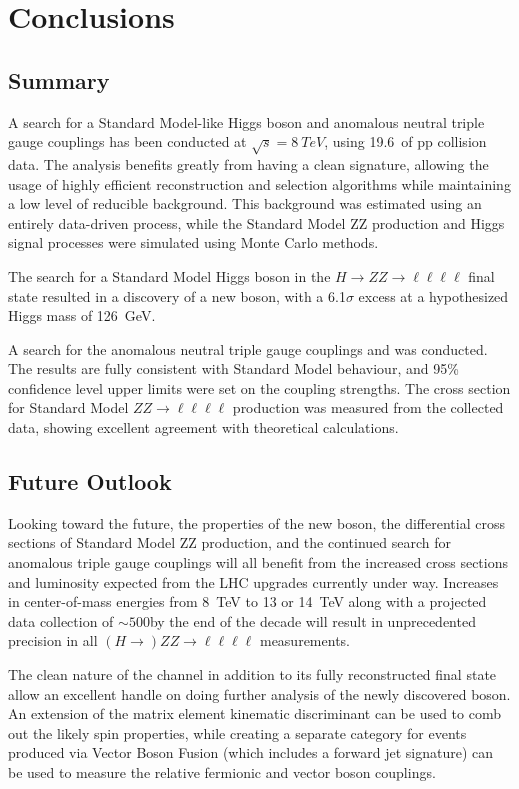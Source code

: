 \chapter{Conclusions}
\label{chapter:conclusions}
\section{Summary}

A search for a Standard Model-like Higgs boson and anomalous neutral triple
gauge couplings has been conducted at $\sqrt{s} = 8~TeV$, using 19.6~\fbinv of
pp collision data. The analysis benefits greatly from having a clean signature,
allowing the usage of highly efficient reconstruction and selection algorithms
while maintaining a low level of reducible background. This background was
estimated using an entirely data-driven process, while the Standard Model ZZ
production and Higgs signal processes were simulated using Monte Carlo methods.

The search for a Standard Model Higgs boson in the $H\rightarrow ZZ\rightarrow
\ell\ell\ell\ell$ final state resulted in a discovery of a new boson, with a
6.1$\sigma$ excess at a hypothesized Higgs mass of 126~GeV. 

A search for the anomalous neutral triple gauge couplings \ffour and \ffive was
conducted. The results are fully consistent with Standard Model behaviour, and
95\% confidence level upper limits were set on the coupling strengths. The cross
section for Standard Model $ZZ\rightarrow\ell\ell\ell\ell$ production was
measured from the collected data, showing excellent agreement with theoretical
calculations.


\section{Future Outlook}
Looking toward the future, the properties of the new boson, the differential
cross sections of Standard Model ZZ production, and the continued search for
anomalous triple gauge couplings will all benefit from the increased cross
sections and luminosity expected from the LHC upgrades currently under way.
Increases in center-of-mass energies from 8~TeV to 13 or 14~TeV along with a
projected data collection of ${\sim500}$\fbinv by the end of the decade will
result in unprecedented precision in all ${(H\rightarrow)ZZ\rightarrow
\ell\ell\ell\ell}$ measurements.

The clean nature of the channel in addition to its fully reconstructed final
state allow an excellent handle on doing further analysis of the newly discovered
boson. An extension of the matrix element kinematic discriminant can be used to
comb out the likely spin properties, while creating a separate category for
events produced via Vector Boson Fusion (which includes a forward jet signature)
can be used to measure the relative fermionic and vector boson couplings. 
